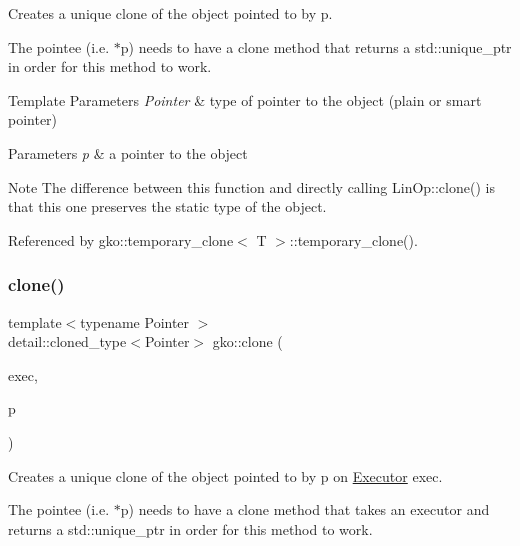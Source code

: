 Creates a unique clone of the object pointed to by {\ttfamily p}. 

The pointee (i.\+e. {\ttfamily $\ast$p}) needs to have a clone method that returns a std\+::unique\+\_\+ptr in order for this method to work.


\begin{DoxyTemplParams}{Template Parameters}
{\em Pointer} & type of pointer to the object (plain or smart pointer)\\
\hline
\end{DoxyTemplParams}

\begin{DoxyParams}{Parameters}
{\em p} & a pointer to the object\\
\hline
\end{DoxyParams}
\begin{DoxyNote}{Note}
The difference between this function and directly calling Lin\+Op\+::clone() is that this one preserves the static type of the object. 
\end{DoxyNote}


Referenced by gko\+::temporary\+\_\+clone$<$ T $>$\+::temporary\+\_\+clone().

\mbox{\label{namespacegko_a13b00a9dd24aa08d4495762d89f3762a}} 
\subsubsection{\texorpdfstring{clone()}{clone()}\hspace{0.1cm}{\footnotesize\ttfamily [2/2]}}
{\footnotesize\ttfamily template$<$typename Pointer $>$ \\
detail\+::cloned\+\_\+type$<$Pointer$>$ gko\+::clone (\begin{DoxyParamCaption}\item[{std\+::shared\+\_\+ptr$<$ const \hyperlink{classgko_1_1Executor}{Executor} $>$}]{exec,  }\item[{const Pointer \&}]{p }\end{DoxyParamCaption})\hspace{0.3cm}{\ttfamily [inline]}}



Creates a unique clone of the object pointed to by {\ttfamily p} on \hyperlink{classgko_1_1Executor}{Executor} {\ttfamily exec}. 

The pointee (i.\+e. {\ttfamily $\ast$p}) needs to have a clone method that takes an executor and returns a std\+::unique\+\_\+ptr in order for this method to work.


